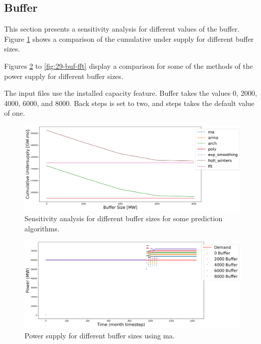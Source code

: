\documentclass[11pt]{article}
\begin{document}
\subsection{Buffer}

This section presents a sensitivity analysis for different values of the buffer. Figure \ref{fig:29-buff} shows a comparison of the cumulative under supply for different buffer sizes.

Figures \ref{fig:29-buf-ma} to \ref{fig:29-buf-fft} display a comparison for some of the methods of the power supply for different buffer sizes.

The input files use the installed capacity feature. Buffer takes the values 0, 2000, 4000, 6000, and 8000. Back steps is set to two, and steps takes the default value of one.

\begin{figure}[!h]
	\centering
	\includegraphics[width=\textwidth]{29-figures/29-sens-buffer.png} 
	\hfill
	\caption{Sensitivity analysis for different buffer sizes for some prediction algorithms.}
	\label{fig:29-buff}
\end{figure}

\begin{figure}[!h]
	\centering
	\includegraphics[width=\textwidth]{29-figures/29-power-buffer-ma.png} 
	\hfill
	\caption{Power supply for different buffer sizes using ma.}
	\label{fig:29-buf-ma}
\end{figure}
\end{document}
